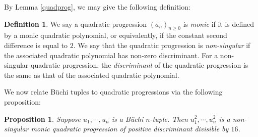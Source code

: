 \documentclass[letterpaper,10pt]{amsart}
\newtheorem{proposition}[theorem]{Proposition}
\theoremstyle{definition}
\newtheorem{definition}[theorem]{Definition}
\numberwithin{equation}{section}
\begin{document}
By Lemma \ref{quadprog}, we may give the following definition: 

\begin{definition} \label{monquad} We say a quadratic progression $(a_n)_{n \geq 0}$ is \emph{monic} if it is defined by a monic quadratic polynomial, or equivalently, if the constant second difference is equal to $2$. We say that the quadratic progression is \emph{non-singular} if the associated quadratic polynomial has non-zero discriminant. For a non-singular quadratic progression, the \emph{discriminant} of the quadratic progression is the same as that of the associated quadratic polynomial. 
\end{definition}

We now relate B\"{u}chi tuples to quadratic progressions via the following proposition: 

\begin{proposition} Suppose $u_1, \cdots, u_n$ is a B\"{u}chi $n$-tuple. Then $u_1^2, \cdots, u_n^2$ is a non-singular monic quadratic progression of positive discriminant divisible by $16$. 
\end{proposition} 
\end{document}

